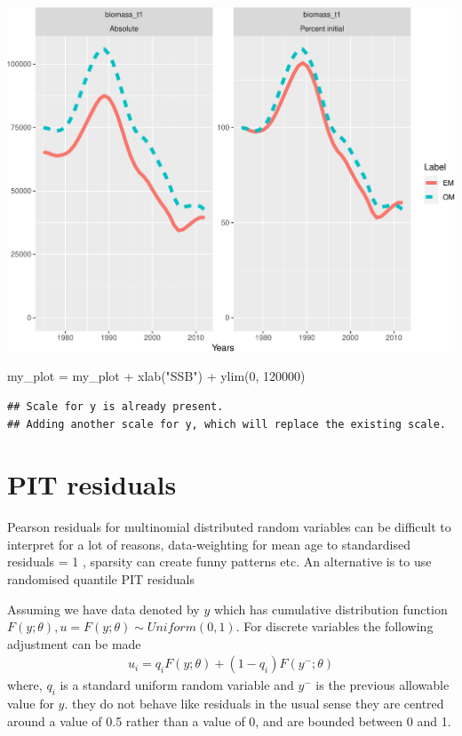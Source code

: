 \documentclass[
]{book}
\newenvironment{Shaded}{\begin{snugshade}}{\end{snugshade}}
\newcommand{\DecValTok}[1]{\textcolor[rgb]{0.00,0.00,0.81}{#1}}
\newcommand{\FunctionTok}[1]{\textcolor[rgb]{0.00,0.00,0.00}{#1}}
\newcommand{\NormalTok}[1]{#1}
\newcommand{\OtherTok}[1]{\textcolor[rgb]{0.56,0.35,0.01}{#1}}
\newcommand{\SpecialCharTok}[1]{\textcolor[rgb]{0.00,0.00,0.00}{#1}}
\newcommand{\StringTok}[1]{\textcolor[rgb]{0.31,0.60,0.02}{#1}}
\begin{document}
\includegraphics{_main_files/figure-latex/compare_EM_OM-1.pdf}

\begin{Shaded}
\begin{Highlighting}[]
\NormalTok{my\_plot }\OtherTok{=}\NormalTok{ my\_plot }\SpecialCharTok{+} \FunctionTok{xlab}\NormalTok{(}\StringTok{"SSB"}\NormalTok{) }\SpecialCharTok{+} \FunctionTok{ylim}\NormalTok{(}\DecValTok{0}\NormalTok{, }\DecValTok{120000}\NormalTok{)}
\end{Highlighting}
\end{Shaded}

\begin{verbatim}
## Scale for y is already present.
## Adding another scale for y, which will replace the existing scale.
\end{verbatim}

\hypertarget{pit-residuals}{%
\section{PIT residuals}\label{pit-residuals}}

Pearson residuals for multinomial distributed random variables can be difficult to interpret for a lot of reasons, data-weighting for mean age to standardised residuals = 1 \citep{francis2011data}, sparsity can create funny patterns etc. An alternative is to use randomised quantile PIT residuals \citep{warton2017pit, dunn1996randomized}

Assuming we have data denoted by \(y\) which has cumulative distribution function \(F(y; \theta), u = F(y; \theta) \sim Uniform(0,1)\). For discrete variables the following adjustment can be made
\begin{align}
u_i = q_i F(y; \theta) + (1 - q_i) F(y^{-}; \theta) 
\end{align}
where, \(q_i\) is a standard uniform random variable and \(y^{-}\) is the previous allowable value for \(y\).
they do not behave like residuals in the usual sense they are centred around a value of 0.5 rather than a value of 0, and are bounded between 0 and 1.
\end{document}
